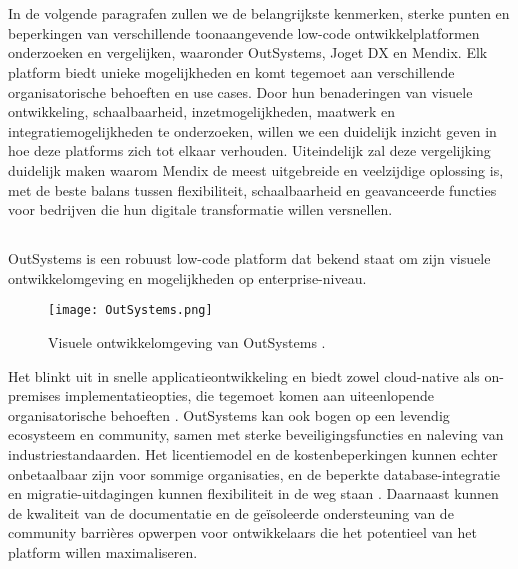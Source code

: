 \section{}%
In de volgende paragrafen zullen we de belangrijkste kenmerken, sterke punten en beperkingen van verschillende toonaangevende low-code ontwikkelplatformen onderzoeken en vergelijken, waaronder OutSystems, Joget DX en Mendix. Elk platform biedt unieke mogelijkheden en komt tegemoet aan verschillende organisatorische behoeften en use cases. Door hun benaderingen van visuele ontwikkeling, schaalbaarheid, inzetmogelijkheden, maatwerk en integratiemogelijkheden te onderzoeken, willen we een duidelijk inzicht geven in hoe deze platforms zich tot elkaar verhouden. Uiteindelijk zal deze vergelijking duidelijk maken waarom Mendix de meest uitgebreide en veelzijdige oplossing is, met de beste balans tussen flexibiliteit, schaalbaarheid en geavanceerde functies voor bedrijven die hun digitale transformatie willen versnellen.
\subsection{}
OutSystems is een robuust low-code platform dat bekend staat om zijn visuele ontwikkelomgeving en mogelijkheden op enterprise-niveau. 

\begin{figure}[H]
    \centering
    \texttt{[image: OutSystems.png]}
    \caption[Evolution]{\label{fig:outsystems} Visuele ontwikkelomgeving van OutSystems \autocite{FigueiraPutresza2021}.}
\end{figure}


Het blinkt uit in snelle applicatieontwikkeling en biedt zowel cloud-native als on-premises implementatieopties, die tegemoet komen aan uiteenlopende organisatorische behoeften \autocite{Sido2024}. OutSystems kan ook bogen op een levendig ecosysteem en community, samen met sterke beveiligingsfuncties en naleving van industriestandaarden. Het licentiemodel en de kostenbeperkingen kunnen echter onbetaalbaar zijn voor sommige organisaties, en de beperkte database-integratie en migratie-uitdagingen kunnen flexibiliteit in de weg staan \autocite{Sido2024}. Daarnaast kunnen de kwaliteit van de documentatie en de geïsoleerde ondersteuning van de community barrières opwerpen voor ontwikkelaars die het potentieel van het platform willen maximaliseren.
